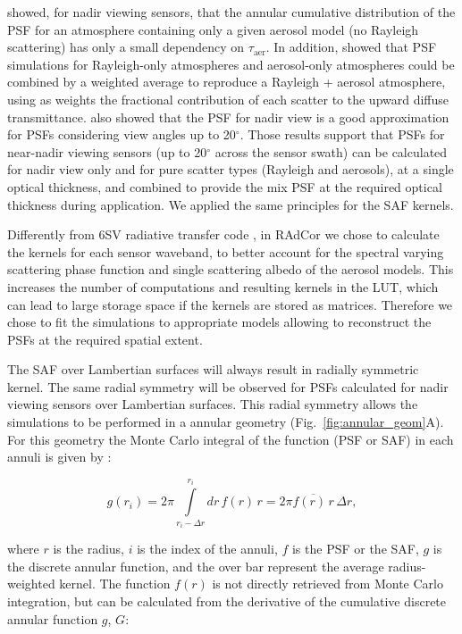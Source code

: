\citet{Tanre1987} showed, for nadir viewing sensors, that the annular cumulative distribution of the PSF for an atmosphere containing only a given aerosol model (no Rayleigh scattering) has only a small dependency on $\tau_\text{aer}$. In addition, \citet{Reinersman1995} showed that PSF simulations for Rayleigh-only atmospheres and aerosol-only atmospheres could be combined by a weighted average to reproduce a Rayleigh + aerosol atmosphere, using as weights the fractional contribution of each scatter to the upward diffuse transmittance. \citet{Reinersman1995} also showed that the PSF for nadir view is a good approximation for PSFs considering view angles up to 20$^\circ$. Those results support that PSFs for near-nadir viewing sensors (up to 20$^\circ$ across the sensor swath) can be calculated for nadir view only and for pure scatter types (Rayleigh and aerosols), at a single optical thickness, and combined to provide the mix PSF at the required optical thickness during application. We applied the same principles for the SAF kernels.

Differently from 6SV radiative transfer code \citep{Vermote1997}, in RAdCor we chose to calculate the kernels for each sensor waveband, to better account for the spectral varying scattering phase function and single scattering albedo of the aerosol models. This increases the number of computations and resulting kernels in the LUT, which can lead to large storage space if the kernels are stored as matrices. Therefore we chose to fit the simulations to appropriate models allowing to reconstruct the PSFs at the required spatial extent.

The SAF over Lambertian surfaces will always result in radially symmetric kernel. The same radial symmetry will be observed for PSFs calculated for nadir viewing sensors over Lambertian surfaces. This radial symmetry allows the simulations to be performed in a annular geometry (Fig.~\ref{fig:annular_geom}A). For this geometry the Monte Carlo integral of the function (PSF or SAF) in each annuli is given by \citep{Tanre1981}:

\begin{equation}
g(r_i) = 2 \pi \int\limits_{r_i - \Delta r}^{r_i} d r \, f(r) \, r = 2 \pi \overbar{f(r) \, r} \, \Delta r,
\label{eq:annular_accumulator}
\end{equation} 

\noindent where $r$ is the radius, $i$ is the index of the annuli, $f$ is the PSF or the SAF, $g$ is the discrete annular function, and the over bar represent the average radius-weighted kernel. The function $f(r)$ is not directly retrieved from Monte Carlo integration, but can be calculated from the derivative of the cumulative discrete annular function $g$, $G$:

